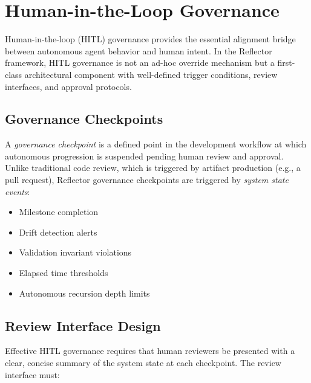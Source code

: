 \section{Human-in-the-Loop Governance}
\label{sec:human-in-the-loop}

%

Human-in-the-loop (HITL) governance provides the essential alignment bridge between
autonomous agent behavior and human intent. In the Reflector framework, HITL governance
is not an ad-hoc override mechanism but a first-class architectural component with
well-defined trigger conditions, review interfaces, and approval protocols.

\subsection{Governance Checkpoints}

A \textit{governance checkpoint} is a defined point in the development workflow at
which autonomous progression is suspended pending human review and approval. Unlike
traditional code review, which is triggered by artifact production (e.g., a pull
request), Reflector governance checkpoints are triggered by \textit{system state events}:

\begin{itemize}
  \item Milestone completion
  \item Drift detection alerts
  \item Validation invariant violations
  \item Elapsed time thresholds
  \item Autonomous recursion depth limits
\end{itemize}

\subsection{Review Interface Design}

Effective HITL governance requires that human reviewers be presented with a clear,
concise summary of the system state at each checkpoint. The review interface must:

